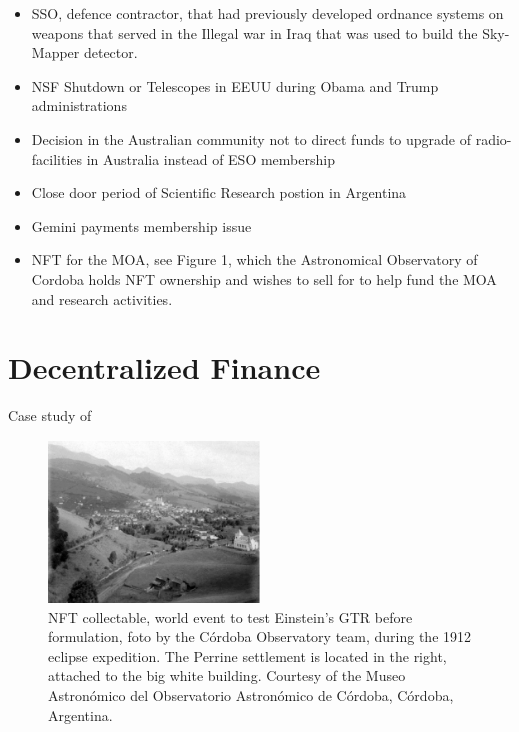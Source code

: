 \documentclass[final,5p,times,twocolumn,authoryear]{elsarticle}
\begin{document}
\begin{itemize}
    \item{SSO, defence contractor, that had previously developed ordnance systems on weapons that served in the Illegal war in Iraq that was used to build the Sky-Mapper detector. } 
    \item{NSF Shutdown or Telescopes in EEUU during Obama and Trump administrations}
    \item{Decision in the Australian community not to direct funds to upgrade of radio-facilities in Australia instead of ESO membership}
    \item{Close door period of Scientific Research postion in Argentina}
    \item{Gemini payments membership issue}
    \item{NFT for the MOA}, see Figure 1, which the Astronomical Observatory of Cordoba holds NFT ownership and wishes to sell for to help fund the MOA and research activities. 

\end{itemize}


\section{Decentralized Finance} 

Case study of 
\begin{figure}[h!]
    \centering
    \label{fig:my_label}
  \caption{NFT collectable, world event to test Einstein's GTR before formulation, foto by the C\'ordoba Observatory team,
during the 1912 eclipse expedition. The Perrine settlement is located in the right, attached to the big white building. Courtesy of the Museo Astron\'omico del Observatorio Astron\'omico de C\'ordoba, C\'ordoba, Argentina.}
  \includegraphics[width=0.5\textwidth]{figs/p1912.eps}
\end{figure}




\end{document}
